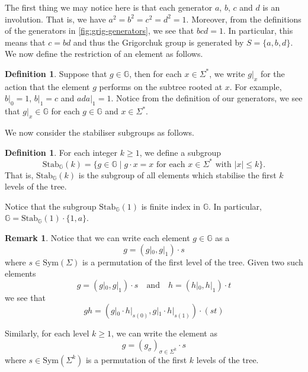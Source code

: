 \documentclass[11pt,a4paper,reqno]{amsart}
\theoremstyle{plain}
\theoremstyle{definition}
\newtheorem{definition}[theorem]{Definition}
\theoremstyle{definition}
\newtheorem{remark}[theorem]{Remark}
\renewcommand\leq\leqslant
\renewcommand\geq\geqslant
\begin{document}
The first thing we may notice here is that each generator $a$, $b$, $c$ and $d$ is an involution.
That is, we have $a^2 = b^2 = c^2 = d^2=1$.
Moreover, from the definitions of the generators in \cref{fig:grig-generators}, we see that $bcd=1$.
In particular, this means that $c = bd$ and thus the Grigorchuk group is generated by $S=\{a,b,d\}$.
We now define the restriction of an element as follows.

\begin{definition}
  Suppose that $g\in \mathbb G$, then for each $x\in \Sigma^*$, we write
  $
    g|_x
  $
  for the action that the element $g$ performs on the subtree rooted at $x$.
  For example, $b|_0=1$, $b|_1=c$ and $ada|_1=1$.
  Notice from the definition of our generators, we see that
  $g|_x \in \mathbb G$ for each $g\in \mathbb G$ and $x\in \Sigma^*$.
\end{definition}

We now consider the stabiliser subgroups as follows.

\begin{definition}
  For each integer $k \geq 1$, we define a subgroup
  \[
    \mathrm{Stab}_{\mathbb G}(k)
    =
    \{
      g\in \mathbb G
    \mid
      g\cdot x = x
      \text{ for each }
      x\in \Sigma^*
      \text{ with }
      |x|\leq k
    \}.
  \]
  That is, $\mathrm{Stab}_{\mathbb G}(k)$ is the subgroup of all elements which stabilise the first $k$ levels of the tree.

  \medskip

  Notice that the subgroup $\mathrm{Stab}_{\mathbb G}(1)$ is finite index in $\mathbb G$.
In particular, $\mathbb G = \mathrm{Stab}_{\mathbb G}(1) \cdot\{1,a\}$.
\end{definition}

\begin{remark}
Notice that we can write each element $g\in \mathbb G$ as a 
\[
  g = (g|_0,g|_1)\cdot s
\]
where $s \in \mathrm{Sym}(\Sigma)$ is a permutation of the first level of the tree.
Given two such elements
\[
  g = (g|_0,g|_1)\cdot s
  \quad\text{and}\quad
  h = (h|_0,h|_1)\cdot t
\]
we see that
\[
  gh = 
  (g|_0 \cdot h|_{s(0)}, g|_1 \cdot h|_{s(1)}) \cdot (s t)
\]

Similarly, for each level $k \geq 1$, we can write the element as
\[
  g
  =
  \left(
    g_{\sigma}
  \right)_{\sigma\in \Sigma^k}
  \cdot s
\]
where $s\in \mathrm{Sym}(\Sigma^k)$ is a permutation of the first $k$ levels of the tree.
\end{remark}
\end{document}
